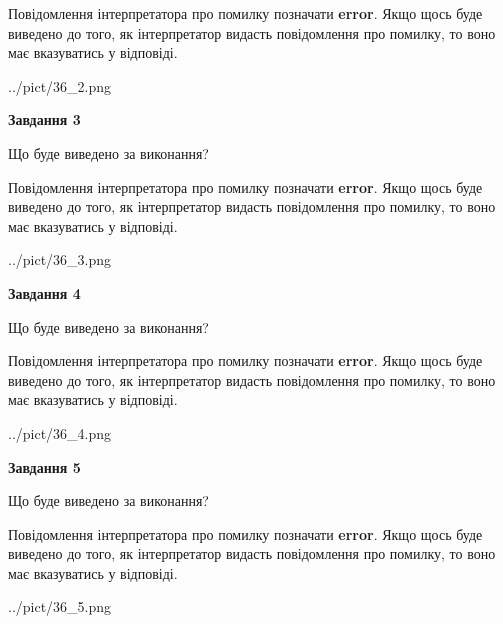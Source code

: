 \documentclass[12pt, ukrainian]{article}
\begin{document}
{\begin {large}
Повідомлення інтерпретатора про помилку позначати \textbf{error}.
Якщо щось буде виведено до того, як інтерпретатор видасть повідомлення про помилку, 
то воно має вказуватись у відповіді. \par


\begin{center}
	{../pict/36_2.png}
\end{center}
\newpage

{\begin {center}\textbf{Завдання 3}\end {center}}\par
Що буде виведено за виконання?

Повідомлення інтерпретатора про помилку позначати \textbf{error}.
Якщо щось буде виведено до того, як інтерпретатор видасть повідомлення про помилку, 
то воно має вказуватись у відповіді. \par


\begin{center}
	{../pict/36_3.png}
\end{center}
\newpage

{\begin {center}\textbf{Завдання 4}\end {center}}\par
Що буде виведено за виконання?

Повідомлення інтерпретатора про помилку позначати \textbf{error}.
Якщо щось буде виведено до того, як інтерпретатор видасть повідомлення про помилку, 
то воно має вказуватись у відповіді. \par


\begin{center}
	{../pict/36_4.png}
\end{center}
\newpage

{\begin {center}\textbf{Завдання 5}\end {center}}\par
Що буде виведено за виконання?

Повідомлення інтерпретатора про помилку позначати \textbf{error}.
Якщо щось буде виведено до того, як інтерпретатор видасть повідомлення про помилку, 
то воно має вказуватись у відповіді. \par


\begin{center}
	{../pict/36_5.png}
\end{center}
\newpage


\end{large}}
\end{document}
